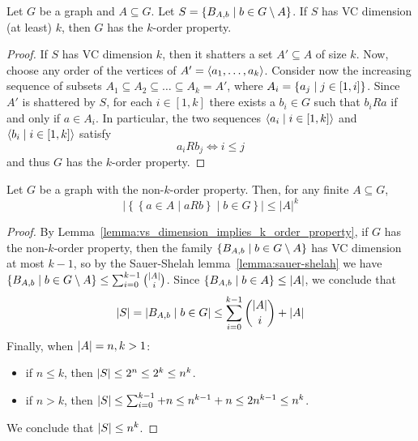     \lemma\label{lemma:vs_dimension_implies_k_order_property}
        Let $G$ be a graph and $A \subseteq G$.
        Let $S = \left\{ B_{A,b} \mid b \in G \setminus A \right\}$.
        If $S$ has VC dimension (at least) $k$, then $G$ has the $k$-order property.
        \begin{proof}
            If $S$ has VC dimension $k$, then it shatters a set $A' \subseteq A$ of size $k$.
            Now, choose any order of the vertices of $A' = \left< a_1, \dots, a_k \right>$.
            Consider now the increasing sequence of subsets $A_1 \subseteq A_2 \subseteq \dots \subseteq A_k = A'$,
            where $A_i = \left\{ a_j \mid j \in [1,i] \right\}$.
            Since $A'$ is shattered by $S$, for each $i \in [1,k]$ there exists a $b_i \in G$ such that
            $b_i R a$ if and only if $a \in A_i$.
            In particular, the two sequences $\left< a_i \mid i \in [1,k] \right>$ and $\left< b_i \mid i \in [1,k] \right>$
            satisfy
            \[
                a_i R b_j \Leftrightarrow i \leq j
            \]
            and thus $G$ has the $k$-order property.
        \end{proof}

    \lemma[Claim 2.6]\label{claim_2.6}
        Let $G$ be a graph with the non-$k$-order property.
        Then, for any finite $A \subseteq G$,
        $$
            \left|\left\{ \left\{ a \in A \mid a R b \right\} \mid b \in G \right\} \right| \leq |A|^k
        $$
        \begin{proof}
            By Lemma~\ref{lemma:vs_dimension_implies_k_order_property}, if $G$ has the non-$k$-order property,
            then the family $\left\{ B_{A,b} \mid b \in G \setminus A \right\}$ has VC dimension at most $k-1$,
            so by the Sauer-Shelah lemma~\ref{lemma:sauer-shelah} we have
            $\left\{ B_{A,b} \mid b \in G \setminus A \right\} \leq \sum_{i=0}^{k-1} \binom{|A|}{i}$.
            Since $\left\{ B_{A,b} \mid b \in A \right\} \leq \left| A \right|$, we conclude that
            \[
                \left| S \right| = \left| B_{A,b} \mid b \in G \right| \leq \sum_{i=0}^{k-1} \binom{|A|}{i} + |A|
            \]
            Finally, when $\left| A \right| = n,k > 1$: 
            \begin{itemize}
                \item if $n \leq k$, then $\left| S \right| \leq 2^n \leq 2^k \leq n^k$.
                \item if $n > k$, then $\left| S \right| \leq \sum_{i=0}^{k-1} + n \leq n^{k-1} + n \leq 2n^{k-1} \leq n^k$.
            \end{itemize}
            We conclude that $\left| S \right| \leq n^k$.
        \end{proof}

